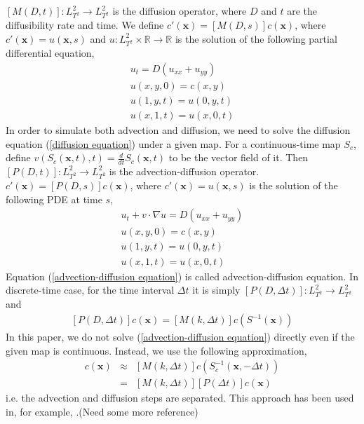 \documentclass{article}
\begin{document}
$[M(D,t)]: L_{T^2}^2  \rightarrow L_{T^2}^2$ is the diffusion operator, where $D$ and $t$ are the diffusibility rate and time. We define $c'(\mathbf{x}) = [M(D,s)]c(\mathbf{x})$, where $c'(\mathbf{x})= u(\mathbf{x},s)$ and $u:L_{T^2}^2 \times \mathbb{R} \rightarrow \mathbb{R} $ is the solution of the following partial differential equation,
   \begin{eqnarray}
   \label{diffusion equation}
    u_{t} = D(u_{xx}+u_{yy})        \\
    u(x,y,0) = c(x,y)      \nonumber\\
    u(1,y,t) = u(0,y,t)    \nonumber\\
    u(x,1,t) = u(x,0,t)    \nonumber
   \end{eqnarray}
In order to simulate both advection and diffusion, we need to solve the diffusion equation (\ref{diffusion equation}) under a given map. For a continuous-time map $S_c$, define $v(S_c(\mathbf{x},t),t) = \frac{d}{dt}S_c(\mathbf{x},t)$ to be the vector field of it. Then $[P(D,t)]:L_{T^2}^2\rightarrow L_{T^2}^2$ is the advection-diffusion operator. $c'(\mathbf{x}) = [P(D,s)]c(\mathbf{x})$, where $c'(\mathbf{x})= u(\mathbf{x},s)$ is the solution of the following PDE at time $s$,
   \begin{eqnarray}
   \label{advection-diffusion equation}
    u_{t} + v \cdot \nabla{u}  = D(u_{xx}+u_{yy})        \\
    u(x,y,0) = c(x,y)      \nonumber\\
    u(1,y,t) = u(0,y,t)    \nonumber\\
    u(x,1,t) = u(x,0,t)    \nonumber
   \end{eqnarray}
Equation (\ref{advection-diffusion equation}) is called advection-diffusion equation. In discrete-time case, for the time interval $\Delta t$ it is simply $[P(D,\Delta t)]:L_{T^2}^2\rightarrow L_{T^2}^2$ and
\begin{eqnarray}
\label{PDdef}
 [P(D,\Delta t)]c(\mathbf{x})= [M(k,\Delta t)]c(S^{-1}(\mathbf{x}))
\end{eqnarray}
In this paper, we do not solve (\ref{advection-diffusion equation}) directly even if the given map is continuous. Instead, we use the following approximation,
\begin{eqnarray}
[P(D,\Delta t)]c(\mathbf{x}) &\approx& [M(k,\Delta t)]c(S_c^{-1}(\mathbf{x}, -\Delta t))\\
                             & =     & [M(k,\Delta t)][P(\Delta t)]c(\mathbf{x})
\end{eqnarray}
i.e. the advection and diffusion steps are separated. This approach has been used in, for example, \cite{Tsang2005}\cite{Thiffeault2003-13}.(Need some more reference)  
\end{document}
